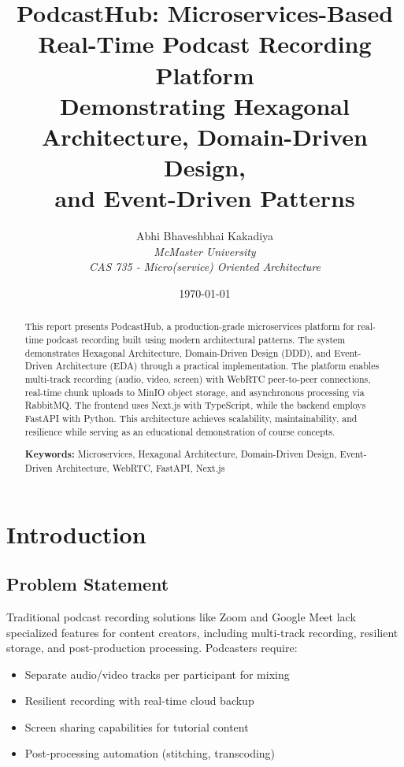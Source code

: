 \documentclass[12pt,a4paper]{article}
\title{
    \textbf{PodcastHub: Microservices-Based \\Real-Time Podcast Recording Platform}\\
    \vspace{0.3cm}
    \large{Demonstrating Hexagonal Architecture, Domain-Driven Design,\\
    and Event-Driven Patterns}
}
\author{
    Abhi Bhaveshbhai Kakadiya\\
    \textit{McMaster University}\\
    \textit{CAS 735 - Micro(service) Oriented Architecture}
}
\date{\today}
\begin{document}
\maketitle

\begin{abstract}
\noindent
This report presents PodcastHub, a production-grade microservices platform for real-time podcast recording built using modern architectural patterns. The system demonstrates Hexagonal Architecture, Domain-Driven Design (DDD), and Event-Driven Architecture (EDA) through a practical implementation. The platform enables multi-track recording (audio, video, screen) with WebRTC peer-to-peer connections, real-time chunk uploads to MinIO object storage, and asynchronous processing via RabbitMQ. The frontend uses Next.js with TypeScript, while the backend employs FastAPI with Python. This architecture achieves scalability, maintainability, and resilience while serving as an educational demonstration of course concepts.

\vspace{0.3cm}
\noindent
\textbf{Keywords:} Microservices, Hexagonal Architecture, Domain-Driven Design, Event-Driven Architecture, WebRTC, FastAPI, Next.js
\end{abstract}
\vspace{7cm}
\tableofcontents
\newpage

\section{Introduction}

\subsection{Problem Statement}
Traditional podcast recording solutions like Zoom and Google Meet lack specialized features for content creators, including multi-track recording, resilient storage, and post-production processing. Podcasters require:
\begin{itemize}[noitemsep]
    \item Separate audio/video tracks per participant for mixing
    \item Resilient recording with real-time cloud backup
    \item Screen sharing capabilities for tutorial content
    \item Post-processing automation (stitching, transcoding)
\end{itemize}
\end{document}
